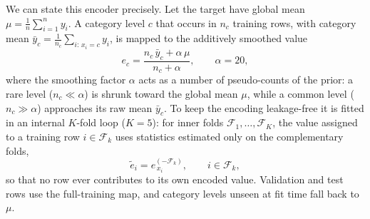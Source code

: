 \documentclass[11pt]{article}
\begin{document}
We can state this encoder precisely. Let the target have global mean $\mu=\frac{1}{n}\sum_{i=1}^{n}y_i$. A category level $c$ that occurs in $n_c$ training rows, with category mean $\bar y_c=\frac{1}{n_c}\sum_{i:\,x_i=c}y_i$, is mapped to the additively smoothed value
\[ e_c=\frac{n_c\,\bar y_c+\alpha\,\mu}{n_c+\alpha},\qquad \alpha=20, \]
where the smoothing factor $\alpha$ acts as a number of pseudo-counts of the prior: a rare level ($n_c\ll\alpha$) is shrunk toward the global mean $\mu$, while a common level ($n_c\gg\alpha$) approaches its raw mean $\bar y_c$. To keep the encoding leakage-free it is fitted in an internal $K$-fold loop ($K=5$): for inner folds $\mathcal{F}_1,\dots,\mathcal{F}_K$, the value assigned to a training row $i\in\mathcal{F}_k$ uses statistics estimated only on the complementary folds,
\[ \tilde e_i=e_{\,x_i}^{(-\mathcal{F}_k)},\qquad i\in\mathcal{F}_k, \]
so that no row ever contributes to its own encoded value. Validation and test rows use the full-training map, and category levels unseen at fit time fall back to $\mu$.
\end{document}
